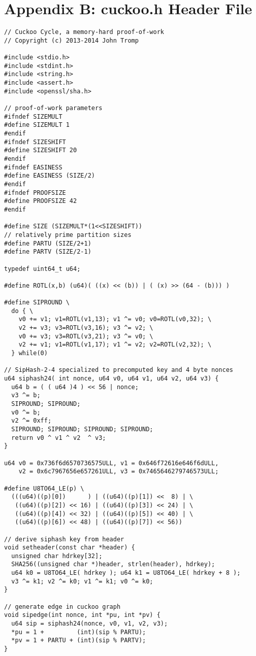 \documentclass[11pt, oneside]{article}
\begin{document}
\section{Appendix B: cuckoo.h Header File}
\footnotesize
\begin{verbatim}
// Cuckoo Cycle, a memory-hard proof-of-work
// Copyright (c) 2013-2014 John Tromp

#include <stdio.h>
#include <stdint.h>
#include <string.h>
#include <assert.h>
#include <openssl/sha.h>

// proof-of-work parameters
#ifndef SIZEMULT 
#define SIZEMULT 1
#endif
#ifndef SIZESHIFT 
#define SIZESHIFT 20
#endif
#ifndef EASINESS 
#define EASINESS (SIZE/2)
#endif
#ifndef PROOFSIZE 
#define PROOFSIZE 42
#endif

#define SIZE (SIZEMULT*(1<<SIZESHIFT))
// relatively prime partition sizes
#define PARTU (SIZE/2+1)
#define PARTV (SIZE/2-1)

typedef uint64_t u64;
 
#define ROTL(x,b) (u64)( ((x) << (b)) | ( (x) >> (64 - (b))) )
 
#define SIPROUND \
  do { \
    v0 += v1; v1=ROTL(v1,13); v1 ^= v0; v0=ROTL(v0,32); \
    v2 += v3; v3=ROTL(v3,16); v3 ^= v2; \
    v0 += v3; v3=ROTL(v3,21); v3 ^= v0; \
    v2 += v1; v1=ROTL(v1,17); v1 ^= v2; v2=ROTL(v2,32); \
  } while(0)
 
// SipHash-2-4 specialized to precomputed key and 4 byte nonces
u64 siphash24( int nonce, u64 v0, u64 v1, u64 v2, u64 v3) {
  u64 b = ( ( u64 )4 ) << 56 | nonce;
  v3 ^= b;
  SIPROUND; SIPROUND;
  v0 ^= b;
  v2 ^= 0xff;
  SIPROUND; SIPROUND; SIPROUND; SIPROUND;
  return v0 ^ v1 ^ v2  ^ v3;
}

u64 v0 = 0x736f6d6570736575ULL, v1 = 0x646f72616e646f6dULL,
    v2 = 0x6c7967656e657261ULL, v3 = 0x7465646279746573ULL;

#define U8TO64_LE(p) \
  (((u64)((p)[0])      ) | ((u64)((p)[1]) <<  8) | \
   ((u64)((p)[2]) << 16) | ((u64)((p)[3]) << 24) | \
   ((u64)((p)[4]) << 32) | ((u64)((p)[5]) << 40) | \
   ((u64)((p)[6]) << 48) | ((u64)((p)[7]) << 56))
 
// derive siphash key from header
void setheader(const char *header) {
  unsigned char hdrkey[32];
  SHA256((unsigned char *)header, strlen(header), hdrkey);
  u64 k0 = U8TO64_LE( hdrkey ); u64 k1 = U8TO64_LE( hdrkey + 8 );
  v3 ^= k1; v2 ^= k0; v1 ^= k1; v0 ^= k0;
}

// generate edge in cuckoo graph
void sipedge(int nonce, int *pu, int *pv) {
  u64 sip = siphash24(nonce, v0, v1, v2, v3);
  *pu = 1 +         (int)(sip % PARTU);
  *pv = 1 + PARTU + (int)(sip % PARTV);
}
\end{verbatim}
\end{document}
